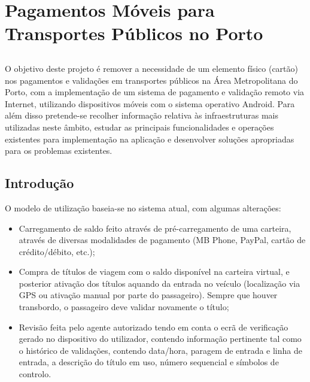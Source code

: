 \chapter{Pagamentos Móveis para Transportes Públicos no Porto}\label{chap:chap3}

\section*{}

O objetivo deste projeto é remover a necessidade de um elemento físico (cartão) nos pagamentos e validações em transportes públicos na Área Metropolitana do Porto, com a implementação de um sistema de pagamento e validação remoto via Internet, utilizando dispositivos móveis com o sistema operativo Android. Para além disso pretende-se recolher informação relativa às infraestruturas mais utilizadas neste âmbito, estudar as principais funcionalidades e operações existentes para implementação na aplicação e desenvolver soluções apropriadas para os problemas existentes.

\section{Introdução}

O modelo de utilização baseia-se no sistema atual, com algumas alterações:
\begin{itemize}
\item Carregamento de saldo feito através de pré-carregamento de uma carteira, através de diversas modalidades de pagamento (MB Phone, PayPal, cartão de crédito/débito, etc.);
\item Compra de títulos de viagem com o saldo disponível na carteira virtual, e posterior ativação dos títulos aquando da entrada no veículo (localização via GPS ou ativação manual por parte do passageiro). Sempre que houver transbordo, o passageiro deve validar novamente o título;
\item Revisão feita pelo agente autorizado tendo em conta o ecrã de verificação gerado no dispositivo do utilizador, contendo informação pertinente tal como o histórico de validações, contendo data/hora, paragem de entrada e linha de entrada, a descrição do título em uso, número sequencial e símbolos de controlo.
\end{itemize}


